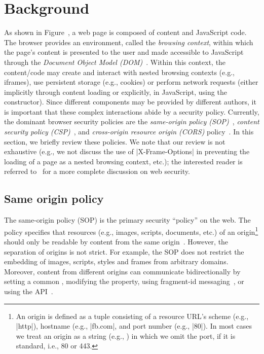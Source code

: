 \section{Background}
\label{sec:background}

%
As shown in Figure~, a web page is composed of
content and JavaScript code.
%
The browser provides an environment, called the \emph{browsing
context}, within which the page's content is presented to the user and
made accessible to JavaScript through the \emph{Document Object Model
(DOM)}~.
%
Within this context, the content/code may create and interact with
nested browsing contexts (e.g., iframes), use persistent storage
(e.g., cookies) or perform network requests (either implicitly through
content loading or explicitly, in JavaScript, using the \xhr{}
constructor).
%
Since different components may be provided by different authors, it is
important that these complex interactions abide by a security policy.
%
Currently, the dominant browser security policies are the
\emph{same-origin policy (SOP)}~\tocite{}, \emph{content security
policy (CSP)}~\tocite{}, and \emph{cross-origin resource origin
(CORS)} policy~\tocite{}.
%
In this section, we briefly review these policies.
%
We note that our review is not exhaustive (e.g., we not discuss the
use of \js|X-Frame-Options| in preventing the loading of a page as a
nested browsing context, etc.);  the interested reader is referred
to~\tocite{} for a more complete discussion on web security.



\subsection{Same origin policy}
\label{sec:background:sop}

The same-origin policy (SOP) is the primary security ``policy'' on the
web.
%
The policy specifies that resources (e.g., images, scripts, documents,
etc.) of an origin\footnote{
An origin is 
defined as a tuple consisting of a resource URL's scheme (e.g.,
\js|http|), hostname (e.g., \js|fb.com|, and port number (e.g.,
\js|80|). In most cases we treat an origin as a string (e.g.,
) in which we omit the port, if it is standard, i.e., 80
or 443.
} should only be readable by content from the same
origin~\cite{rfc6454, VanKesteren2012, googlehandbook}.
%
However, the separation of origins is not strict.
%
For example, the SOP does not restrict the embedding of images,
scripts, styles and frames from arbitrary domains. 
%
Moreover, content from different origins can communicate
bidirectionally by setting a common , modifying
the  property, using fragment-id
messaging~\cite{fragmentmessaging}, or using the 
API~\cite{webmessaging}.

